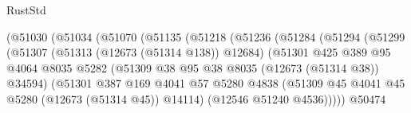 \begin{lexlean}{RustStd}
\begin{coremodule}
                                    (@51030
                                      (@51034
                                        (@51070
                                          (@51135
                                            (@51218
                                              (@51236
                                                (@51284
                                                  (@51294
                                                    (@51299
                                                      (@51307
                                                        (@51313 (@12673 (@51314 @138)) @12684)
                                                        (@51301
                                                          @425
                                                          @389
                                                          @95
                                                          @4064
                                                          @8035
                                                          @5282
                                                          (@51309
                                                            @38
                                                            @95
                                                            @38
                                                            @8035
                                                            (@12673 (@51314 @38))
                                                            @34594)
                                                          (@51301
                                                            @387
                                                            @169
                                                            @4041
                                                            @57
                                                            @5280
                                                            @4838
                                                            (@51309
                                                              @45
                                                              @4041
                                                              @45
                                                              @5280
                                                              (@12673 (@51314 @45))
                                                              @14114)
                                                            (@12546 @51240 @4536)))))
                                                    @50474

\end{coremodule}
\end{lexlean}
